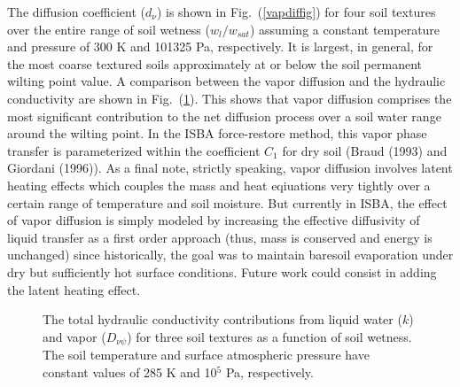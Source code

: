 The diffusion coefficient ($d_\nu$) is
shown in Fig.~(\ref{vapdiffig}) 
for four soil textures 
over the entire range of soil wetness
($w_l/w_{sat}$) assuming a constant
temperature and pressure of 300 K and 101325 Pa,
respectively. It is largest, in general, for the
most coarse textured soils approximately
at or below the soil permanent wilting point value.
A comparison between the vapor diffusion and
the hydraulic conductivity are shown in
Fig.~(\ref{vapdiffig2}). This shows that vapor diffusion
comprises the most significant contribution to 
the net diffusion process over a soil water range
around the wilting point. In the ISBA force-restore method, this vapor
phase transfer is parameterized within the coefficient $C_1$ for dry soil
(Braud \etal (1993) and Giordani (1996)\nocite{Giordani1996}).
%
As a final note, strictly speaking, vapor diffusion involves latent
heating effects which couples the mass and heat eqiuations very
tightly over a certain range of temperature and soil moisture. 
But currently in ISBA, the effect of vapor diffusion is simply modeled
by increasing the effective diffusivity of liquid transfer as a first
order approach (thus, mass is conserved and energy is unchanged) since
historically, the goal was to maintain baresoil evaporation under dry
but sufficiently hot surface conditions. Future work could consist in adding
the latent heating effect.

\begin{figure}[h]
		 \begin{center}
		 \caption{The total hydraulic conductivity contributions
from liquid water ($k$) and vapor ($D_{\nu\psi}$)
for three soil textures as a function of soil wetness.
The soil temperature and surface atmospheric pressure have constant
values of 285 K and 10$^5$ Pa, respectively.}
		 \label{vapdiffig2}
		 \end{center}
\end{figure}

